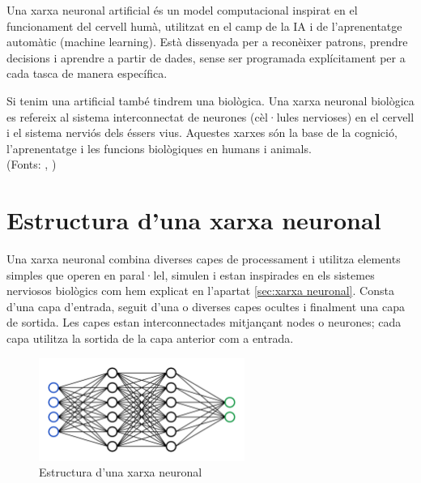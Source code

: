 Una xarxa neuronal artificial és un model computacional inspirat en el funcionament del cervell humà, utilitzat en el camp de la IA i de l'aprenentatge automàtic (machine learning). Està dissenyada per a reconèixer patrons, prendre decisions i aprendre a partir de dades, sense ser programada explícitament per a cada tasca de manera específica.

Si tenim una artificial també tindrem una biològica. Una xarxa neuronal biològica es refereix al sistema interconnectat de neurones (cèl·lules nervioses) en el cervell i el sistema nerviós dels éssers vius. Aquestes xarxes són la base de la cognició, l'aprenentatge i les funcions biològiques en humans i animals.\\
(Fonts: \cite{UOC}, \cite{XarxaBiologica})

\section{Estructura d'una xarxa neuronal}\label{sec:3.6}
Una xarxa neuronal combina diverses capes de processament i utilitza elements simples que operen en paral·lel, simulen i estan inspirades en els sistemes nerviosos biològics com hem explicat en l'apartat \ref{sec:xarxa neuronal}. Consta d'una capa d'entrada, seguit d'una o diverses capes ocultes i finalment una capa de sortida. Les capes estan interconnectades mitjançant nodes o neurones; cada capa utilitza la sortida de la capa anterior com a entrada.

\begin{figure}[h!]
    \centering
    \includegraphics[width=0.6\textwidth]{./figures/xarxa.png}
    \caption{Estructura d'una xarxa neuronal}
\end{figure}

